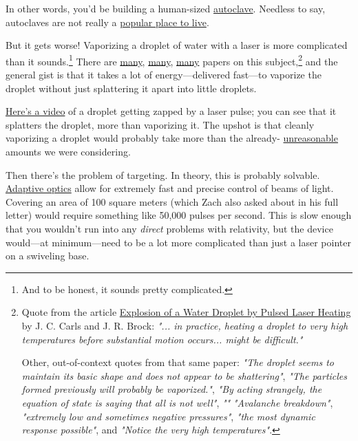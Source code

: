 {{In other words, you'd be building a human-sized \href{https://en.wikipedia.org/wiki/Autoclave}{autoclave}. Needless to say, autoclaves are not really a \href{http://boston.craigslist.org/search/hhh?sort=rel&query=autoclave+you+can+live+in} {popular place to live}.}

{But it gets worse! Vaporizing a droplet of water with a laser is more complicated than it sounds.{\footnote{And to be honest, it sounds pretty complicated.} } There are \href{http://www.opticsinfobase.org/ao/abstract.cfm?uri=ao-24-11-1631}{many}, \href{http://pubs.rsc.org/en/Content/ArticleLanding/2003/CP/b210609d\#!divAbstract}{many}, \href{http://authors.library.caltech.edu/10136/1/SAGao84.pdf}{many} papers on this subject,{\footnote{Quote from the article \href{http://dx.doi.org/10.1080/02786828708959148}{Explosion of a Water Droplet by Pulsed Laser Heating} by J. C. Carls and J. R. Brock: \emph{"... in practice, heating a droplet to very high temperatures before substantial motion occurs... might be difficult."} 

Other, out-of-context quotes from that same paper: \emph{"The droplet seems to maintain its basic shape and does not appear to be shattering"}, \emph{"The particles formed previously will probably be vaporized."}, \emph{"By acting strangely, the equation of state is saying that all is not well"}, \emph{""} \emph{"Avalanche breakdown"}, \emph{"extremely low and sometimes negative pressures"}, \emph{"the most dynamic response possible"}, and \emph{"Notice the very high temperatures"}.} } and the general gist is that it takes a lot of energy—delivered fast—to vaporize the droplet without just splattering it apart into little droplets.}

{ \href{https://www.youtube.com/watch?v=bRbHDtPbHe0}{Here's a video} of a droplet getting zapped by a laser pulse; you can see that it splatters the droplet, more than vaporizing it. The upshot is that cleanly vaporizing a droplet would probably take more than the already- \href{https://en.wikipedia.org/wiki/Autoclave}{unreasonable} amounts we were considering.}

{Then there's the problem of targeting. In theory, this is probably solvable. \href{https://en.wikipedia.org/wiki/Adaptive\_optics}{Adaptive optics} allow for extremely fast and precise control of beams of light. Covering an area of 100 square meters (which Zach also asked about in his full letter) would require something like 50,000 pulses per second. This is slow enough that you wouldn't run into any \emph{direct} problems with relativity, but the device would—at minimum—need to be a lot more complicated than just a laser pointer on a swiveling base.}

}
